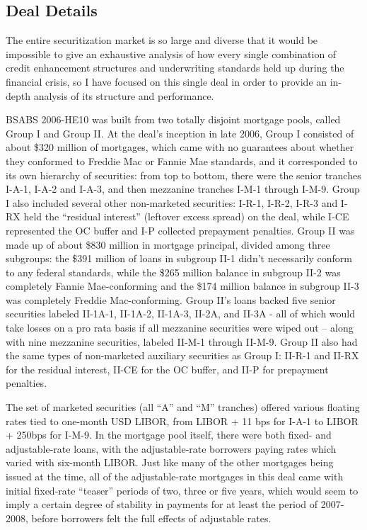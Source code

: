 \documentclass[12pt]{article}
\begin{document}
\subsection*{Deal Details}

The entire securitization market is so large and diverse that it would be impossible to give an exhaustive analysis of how every single combination of credit enhancement structures and underwriting standards held up during the financial crisis, so I have focused on this single deal in order to provide an in-depth analysis of its structure and performance.

BSABS 2006-HE10 was built from two totally disjoint mortgage pools, called Group I and Group II. At the deal’s inception in late 2006, Group I consisted of about \$320 million of mortgages, which came with no guarantees about whether they conformed to Freddie Mac or Fannie Mae standards, and it corresponded to its own hierarchy of securities: from top to bottom, there were the senior tranches I-A-1, I-A-2 and I-A-3, and then mezzanine tranches I-M-1 through I-M-9. Group I also included several other non-marketed securities: I-R-1, I-R-2, I-R-3 and I-RX held the “residual interest” (leftover excess spread) on the deal, while I-CE represented the OC buffer and I-P collected prepayment penalties. Group II was made up of about \$830 million in mortgage principal, divided among three subgroups: the \$391 million of loans in subgroup II-1 didn’t necessarily conform to any federal standards, while the \$265 million balance in subgroup II-2 was completely Fannie Mae-conforming and the \$174 million balance in subgroup II-3 was completely Freddie Mac-conforming. Group II’s loans backed five senior securities labeled II-1A-1, II-1A-2, II-1A-3, II-2A, and II-3A - all of which would take losses on a pro rata basis if all mezzanine securities were wiped out – along with nine mezzanine securities, labeled II-M-1 through II-M-9. Group II also had the same types of non-marketed auxiliary securities as Group I: II-R-1 and II-RX for the residual interest, II-CE for the OC buffer, and II-P for prepayment penalties.

The set of marketed securities (all “A” and “M” tranches) offered various floating rates tied to one-month USD LIBOR, from LIBOR + 11 bps for I-A-1 to LIBOR + 250bps for I-M-9. In the mortgage pool itself, there were both fixed- and adjustable-rate loans, with the adjustable-rate borrowers paying rates which varied with six-month LIBOR. Just like many of the other mortgages being issued at the time, all of the adjustable-rate mortgages in this deal came with initial fixed-rate “teaser” periods of two, three or five years, which would seem to imply a certain degree of stability in payments for at least the period of 2007-2008, before borrowers felt the full effects of adjustable rates.
\end{document}
